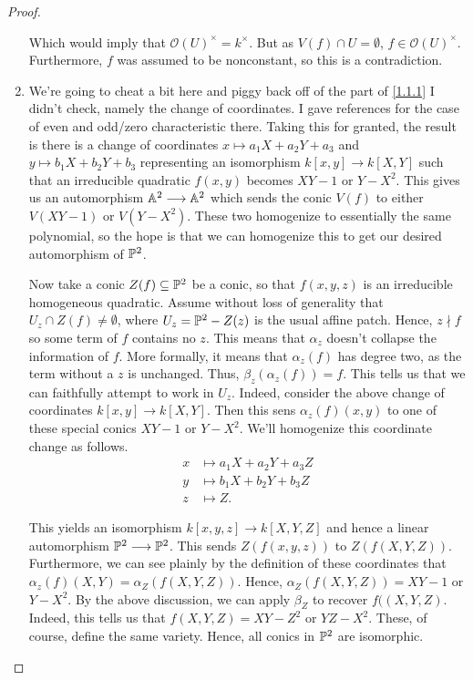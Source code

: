 \begin{proof}
\begin{enumerate}[label = (\alph*)]
        Which would imply that $\mathcal O(U)^\times = k^\times$. But as $V(f) \cap U = \emptyset$, $f \in \mathcal O(U)^\times$. Furthermore, $f$ was assumed to be nonconstant, so this is a contradiction.

        \item We're going to cheat a bit here and piggy back off of the part of \ref{1.1.1} I didn't check, namely the change of coordinates. I gave references for the case of even and odd/zero characteristic there. Taking this for granted, the result is there is a change of coordinates $x \mapsto a_1 X + a_2 Y + a_3$ and $y \mapsto b_1 X + b_2 Y + b_3$ representing an isomorphism $k[x, y] \longrightarrow k[X, Y]$ such that an irreducible quadratic $f(x, y)$ becomes $XY - 1$ or $Y - X^2$. This gives us an automorphism $\A^2 \longrightarrow \A^2$ which sends the conic $V(f)$ to either $V(XY - 1)$ or $V(Y - X^2)$. These two homogenize to essentially the same polynomial, so the hope is that we can homogenize this to get our desired automorphism of $\P^2$.

        Now take a conic $Z(f) \subseteq \P^2$ be a conic, so that $f(x, y, z)$ is an irreducible homogeneous quadratic. Assume without loss of generality that $U_z \cap Z(f) \neq \emptyset$, where $U_z = \P^2 - Z(z)$ is the usual affine patch. Hence, $z \nmid f$ so some term of $f$ contains no $z$. This means that $\alpha_z$ doesn't collapse the information of $f$. More formally, it means that $\alpha_z(f)$ has degree two, as the term without a $z$ is unchanged. Thus, $\beta_z(\alpha_z(f)) = f$. This tells us that we can faithfully attempt to work in $U_z$. Indeed, consider the above change of coordinates $k[x, y] \longrightarrow k[X, Y]$. Then this sens $\alpha_z(f)(x, y)$ to one of these special conics $XY - 1$ or $Y - X^2$. We'll homogenize this coordinate change as follows.
        $$
        \begin{align*}
            x &\mapsto a_1 X + a_2 Y + a_3 Z\\
            y &\mapsto b_1 X + b_2 Y + b_3 Z\\
            z &\mapsto Z.
        \end{align*}
        $$
        
        This yields an isomorphism $k[x, y, z] \longrightarrow k[X, Y, Z]$ and hence a linear automorphism $\P^2 \longrightarrow \P^2$. This sends $Z(f(x, y, z))$ to $Z(f(X, Y, Z))$. Furthermore, we can see plainly by the definition of these coordinates that $\alpha_z(f)(X, Y) = \alpha_Z(f(X, Y, Z))$. Hence, $\alpha_Z(f(X, Y, Z)) = XY - 1$ or $Y - X^2$. By the above discussion, we can apply $\beta_Z$ to recover $f((X, Y, Z)$. Indeed, this tells us that $f(X, Y, Z) = XY - Z^2$ or $YZ - X^2$. These, of course, define the same variety. Hence, all conics in $\P^2$ are isomorphic.


\end{enumerate}
\end{proof}
